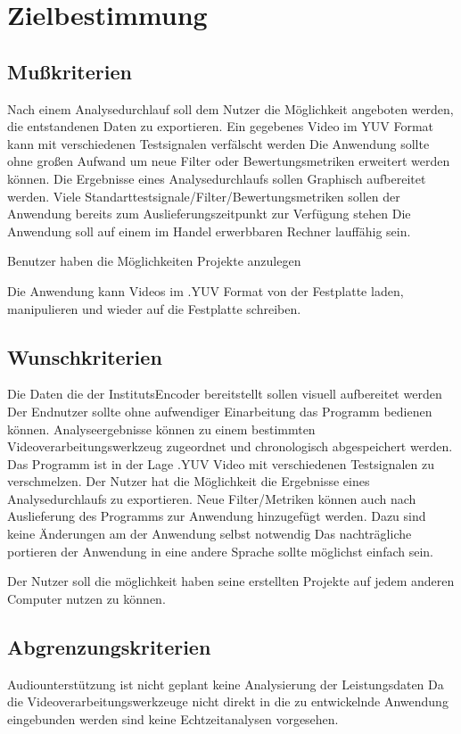 \chapter{Zielbestimmung}

\section{Mußkriterien}

\newItemMK Nach einem Analysedurchlauf soll dem Nutzer die Möglichkeit angeboten werden, die entstandenen Daten zu exportieren. %
\newItemMK Ein gegebenes Video im YUV Format kann mit verschiedenen Testsignalen verfälscht werden %
\newItemMK Die Anwendung sollte ohne großen Aufwand um neue Filter oder Bewertungsmetriken erweitert werden können. %
\newItemMK Die Ergebnisse eines Analysedurchlaufs sollen Graphisch aufbereitet werden. %
\newItemMK Viele Standarttestsignale/Filter/Bewertungsmetriken sollen der Anwendung bereits zum Auslieferungszeitpunkt zur Verfügung stehen %
\newItemMK Die Anwendung soll auf einem im Handel erwerbbaren Rechner lauffähig sein. %

\newItemMK Benutzer haben die Möglichkeiten Projekte anzulegen %

\newItemMK Die Anwendung kann Videos im .YUV Format von der Festplatte laden, manipulieren und wieder auf die Festplatte schreiben. %


\setcounter{enumi}{0}

\section{Wunschkriterien}

\newItemWK Die Daten die der InstitutsEncoder bereitstellt sollen visuell aufbereitet werden
\newItemWK Der Endnutzer sollte ohne aufwendiger Einarbeitung das Programm bedienen können.
\newItemWK Analyseergebnisse können zu einem bestimmten Videoverarbeitungswerkzeug zugeordnet und chronologisch abgespeichert werden.
\newItemWK Das Programm ist in der Lage .YUV Video mit verschiedenen Testsignalen zu verschmelzen.
\newItemWK Der Nutzer hat die Möglichkeit die Ergebnisse eines Analysedurchlaufs zu exportieren.
\newItemWK Neue Filter/Metriken können auch nach Auslieferung des Programms zur Anwendung hinzugefügt werden. Dazu
  sind keine Änderungen am der Anwendung selbst notwendig
\newItemWK Das nachträgliche portieren der Anwendung in eine andere Sprache sollte möglichst einfach sein.

\newItemWK Der Nutzer soll die möglichkeit haben seine erstellten Projekte auf jedem anderen Computer nutzen zu können.

\setcounter{enumi}{0}

\section{Abgrenzungskriterien}

\newItemAK Audiounterstützung ist nicht geplant
\newItemAK keine Analysierung der Leistungsdaten
\newItemAK Da die Videoverarbeitungswerkzeuge nicht direkt in die zu entwickelnde Anwendung eingebunden werden sind keine Echtzeitanalysen vorgesehen.


\setcounter{enumi}{0}
